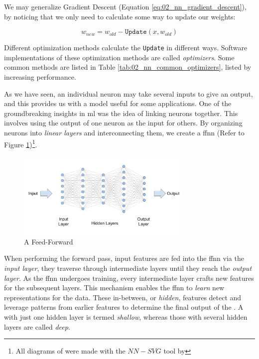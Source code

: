 
\label{02_nn_optimizers}

We may generalize Gradient Descent (Equation \ref{eq:02_nn_gradient_descent}), by noticing that we only need to calculate some way to update our weights:

\begin{equation}
    w_{new} = w_{old} - \texttt{Update}(x, w_{old})
\end{equation}

Different optimization methods calculate the \texttt{Update} in different ways. Software implementations of these optimization methods are called \emph{optimizers}. Some common methods are listed in Table \ref{tab:02_nn_common_optimizers}, listed by increasing performance.




\label{02_nn_ffnn}

As we have seen, an individual neuron may take several inputs to give an output, and this provides us with a model useful for some applications. 
One of the groundbreaking insights in \gls{ml} was the idea of linking neurons together. This involves using the output of one neuron as the input for others. By organizing neurons into \emph{linear layers} and interconnecting them, we create a \gls{ffnn} (Refer to Figure \ref{fig:02_nn_ffnn})\footnote{All diagrams of \neuralNetwork{} were made with the $NN-SVG$ tool by }.

\begin{figure}
    \centering
    \includegraphics[width=0.75\textwidth]{Figures/02/02_FFNN.png}
    \caption{A Feed-Forward \neuralNetwork{}}
    \label{fig:02_nn_ffnn}
\end{figure}

When performing the forward pass, input features are fed into the \gls{ffnn} via the \emph{input layer}, they traverse through intermediate layers until they reach the \emph{output layer}.
As the \gls{ffnn} undergoes training, every intermediate layer crafts new features for the subsequent layers. 
This mechanism enables the \gls{ffnn} to \emph{learn} new representations for the data.
These in-between, or \emph{hidden}, features detect and leverage patterns from earlier features to determine the final output of the \neuralNetwork{}. A \neuralNetwork{} with just one hidden layer is termed \emph{shallow}, whereas those with several hidden layers are called \emph{deep}.

